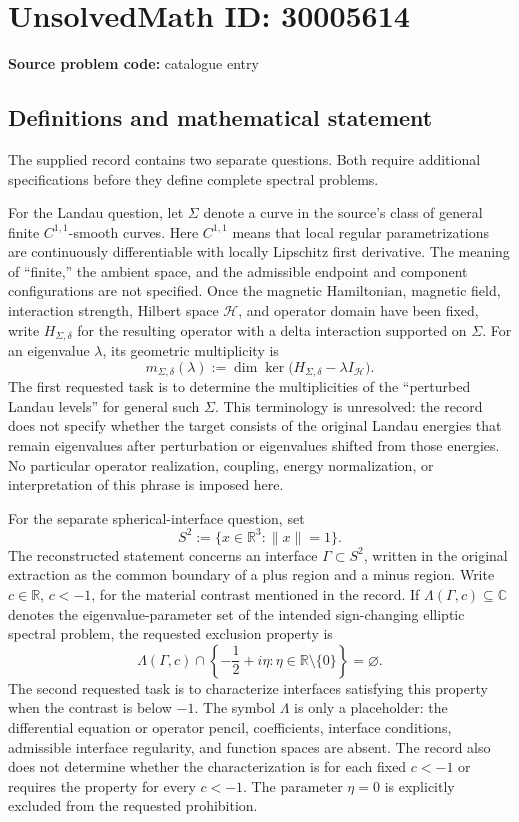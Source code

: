 \documentclass[11pt]{article}
\newcommand{\R}{\mathbb{R}}
\newcommand{\C}{\mathbb{C}}
\begin{document}
\section*{UnsolvedMath ID: 30005614}
\textbf{Source problem code:} catalogue entry
\subsection{Definitions and mathematical statement}
The supplied record contains two separate questions. Both require additional specifications before they define complete spectral problems.

For the Landau question, let \(\Sigma\) denote a curve in the source's class of general finite \(C^{1,1}\)-smooth curves. Here \(C^{1,1}\) means that local regular parametrizations are continuously differentiable with locally Lipschitz first derivative. The meaning of ``finite,'' the ambient space, and the admissible endpoint and component configurations are not specified. Once the magnetic Hamiltonian, magnetic field, interaction strength, Hilbert space \(\mathcal H\), and operator domain have been fixed, write \(H_{\Sigma,\delta}\) for the resulting operator with a delta interaction supported on \(\Sigma\). For an eigenvalue \(\lambda\), its geometric multiplicity is
\[
 m_{\Sigma,\delta}(\lambda)
 :=\dim\ker\bigl(H_{\Sigma,\delta}-\lambda I_{\mathcal H}\bigr).
\]
The first requested task is to determine the multiplicities of the ``perturbed Landau levels'' for general such \(\Sigma\). This terminology is unresolved: the record does not specify whether the target consists of the original Landau energies that remain eigenvalues after perturbation or eigenvalues shifted from those energies. No particular operator realization, coupling, energy normalization, or interpretation of this phrase is imposed here.

For the separate spherical-interface question, set
\[
 S^2:=\{x\in\R^3:\lVert x\rVert=1\}.
\]
The reconstructed statement concerns an interface \(\Gamma\subset S^2\), written in the original extraction as the common boundary of a plus region and a minus region. Write \(c\in\R\), \(c<-1\), for the material contrast mentioned in the record. If \(\Lambda(\Gamma,c)\subseteq\C\) denotes the eigenvalue-parameter set of the intended sign-changing elliptic spectral problem, the requested exclusion property is
\[
 \Lambda(\Gamma,c)\cap
 \left\{-\frac12+i\eta:\eta\in\R\setminus\{0\}\right\}
 =\varnothing.
\]
The second requested task is to characterize interfaces satisfying this property when the contrast is below \(-1\). The symbol \(\Lambda\) is only a placeholder: the differential equation or operator pencil, coefficients, interface conditions, admissible interface regularity, and function spaces are absent. The record also does not determine whether the characterization is for each fixed \(c<-1\) or requires the property for every \(c<-1\). The parameter \(\eta=0\) is explicitly excluded from the requested prohibition.
\end{document}
